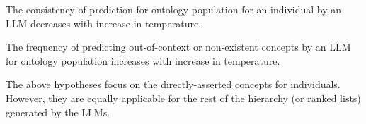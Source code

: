 \documentclass[a4paper,colorinlistoftodos]{article}
\begin{document}
\begin{hypothesis} The consistency of prediction for ontology population for
an individual by an LLM decreases with increase in temperature.
\end{hypothesis}

\begin{hypothesis} The frequency of predicting out-of-context or non-existent
concepts by an LLM for ontology population increases with increase in
temperature.
\end{hypothesis}

The above hypotheses focus on the directly-asserted concepts for
individuals. However, they are equally applicable for the rest of the
hierarchy (or ranked lists) generated by the LLMs.



\end{document}
